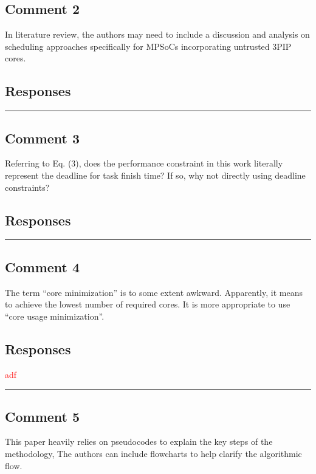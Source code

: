 \documentclass[10pt,journal, compsoc]{IEEEtran}
\begin{document}
\subsection*{Comment 2}
In literature review, the authors may need to include a discussion and analysis on scheduling approaches specifically for MPSoCs incorporating untrusted 3PIP cores.

\subsection*{Responses}



\noindent\rule[0.25\baselineskip]{252pt}{1pt}


\subsection*{Comment 3}
Referring to Eq. (3), does the performance constraint in this work literally represent the deadline for task finish time? If so, why not directly using deadline constraints?

\subsection*{Responses}




\noindent\rule[0.25\baselineskip]{252pt}{1pt}



\subsection*{Comment 4}
The term ``core minimization'' is to some extent awkward. Apparently, it means to achieve the lowest number of required cores. It is more appropriate to use ``core usage minimization''. 

\subsection*{Responses}

\textcolor{red}{adf}

\noindent\rule[0.25\baselineskip]{252pt}{1pt}


\subsection*{Comment 5}
This paper heavily relies on pseudocodes to explain the key steps of the methodology, The authors can include flowcharts to help clarify the algorithmic flow.
\end{document}

